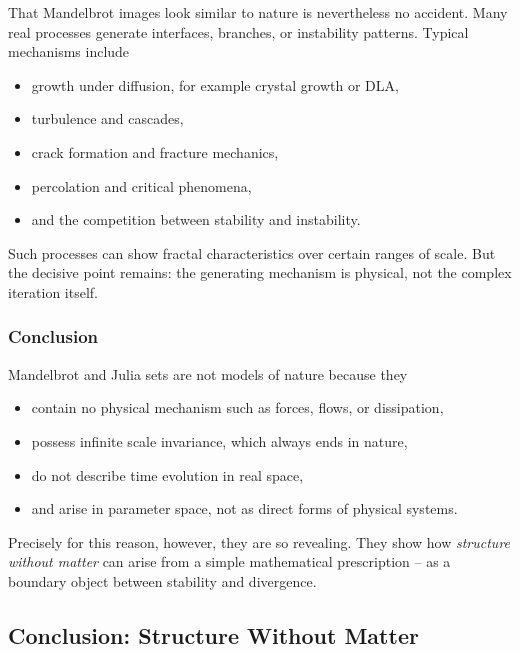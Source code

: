 That Mandelbrot images look similar to nature
is nevertheless no accident.
Many real processes generate interfaces, branches, or instability patterns.
Typical mechanisms include
\begin{itemize}
	\item growth under diffusion, for example crystal growth or DLA,
	\item turbulence and cascades,
	\item crack formation and fracture mechanics,
	\item percolation and critical phenomena,
	\item and the competition between stability and instability.
\end{itemize}

Such processes can show fractal characteristics over certain ranges of scale.
But the decisive point remains:
the generating mechanism is physical,
not the complex iteration itself.

\subsubsection*{Conclusion}

Mandelbrot and Julia sets are not models of nature because they
\begin{itemize}
	\item contain no physical mechanism such as forces, flows, or dissipation,
	\item possess infinite scale invariance, which always ends in nature,
	\item do not describe time evolution in real space,
	\item and arise in parameter space, not as direct forms of physical systems.
\end{itemize}

Precisely for this reason, however, they are so revealing.
They show
how \emph{structure without matter} can arise
from a simple mathematical prescription --
as a boundary object between stability and divergence.


\subsection{Conclusion: Structure Without Matter}
\label{sec:7.7}

